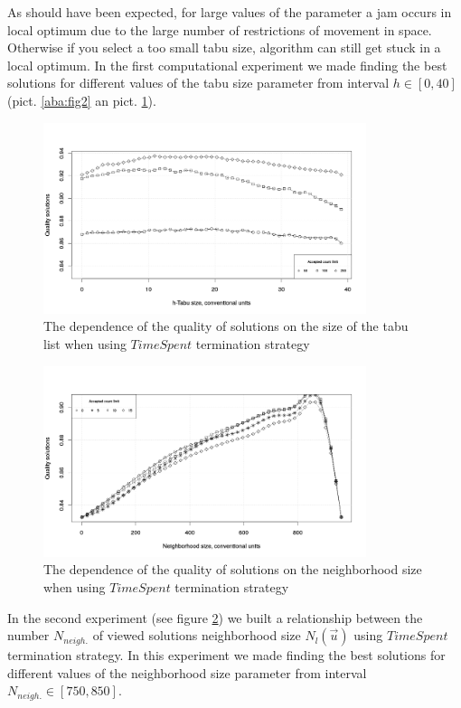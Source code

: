 \documentclass[]{TAACpaper}
\begin{document}
As should have been expected, for large values of the parameter a jam occurs in local optimum due to the large number of restrictions of movement in space. Otherwise if you select a too small tabu size, algorithm can still get stuck in a local optimum. In the first computational experiment we made finding the best solutions for different values of the tabu size parameter from interval $h \in [0, 40]$ (pict. \ref{aba:fig2} an pict. \ref{aba:fig3}).
\begin{figure}[h]
	\hfil\includegraphics[height=2.2in]{images/tabuSize_time}\hfil
	\caption{
	  The dependence of the quality of solutions on the size of the tabu list when using $ TimeSpent $ termination strategy
	}
	\label{aba:fig3}
\end{figure}

\begin{figure}[h]
	\hfil\includegraphics[height=2.2in]{images/acceptedCountLimit}\hfil
	\caption{
	  The dependence of the quality of solutions on the neighborhood size when using $ TimeSpent $ termination strategy
	}
	
	\label{aba:fig4}
\end{figure}

In the second experiment (see figure \ref{aba:fig4}) we built a relationship between the number $N_{neigh.}$ of viewed solutions neighborhood size $N_l(\vec{u})$ using $TimeSpent$ termination strategy. In this experiment we made finding the best solutions for different values of the neighborhood size parameter from interval $N_{neigh.}\in[750, 850]$.
\end{document}
